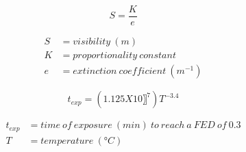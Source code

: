 \documentclass[10pt]{book}
\begin{document}
\begin{mdSnippets}
\begin{mdDisplaySnippet}[8275ab90e7449fb077f5cc158b6fcccf]%
\[%
S = \frac{K}{e} 
\]%
\end{mdDisplaySnippet}%
\begin{mdDisplaySnippet}[010f006a878c2a6b61bb5d61f9aba990]%
\[%
\begin{aligned}
S &= visibility~(m) \\
K &= proportionality~constant\\
e &= extinction~coefficient~(m^{-1})
\end{aligned}
\]%
\end{mdDisplaySnippet}%
\begin{mdDisplaySnippet}[657f807bd2cd36e3a93da3b2e69b2db2]%
\[%
t_{exp} = (1.125X10〗^7 ) T^{-3.4}
\]%
\end{mdDisplaySnippet}%
\begin{mdDisplaySnippet}[d65c2e91759be20dbe43f4a00f8d1450]%
\[%
\begin{aligned} 
 t_{exp} &= time~of~exposure~(min)~to~reach~a~FED~of~0.3 \\
T &= temperature~(°C)
\end{aligned}
\]%
\end{mdDisplaySnippet}%

\end{mdSnippets}
\end{document}
